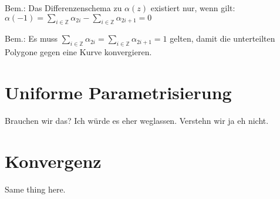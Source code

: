 \documentclass[8pt, DIV15, twocolumn]{scrartcl}
\begin{document}
Bem.: Das Differenzenschema zu $\alpha\left(z\right)$ existiert nur, wenn gilt:
$\alpha\left(-1\right) = \sum\limits_{i\in\mathbb{Z}} \alpha_{2i} - \sum\limits_{i\in\mathbb{Z}} \alpha_{2i + 1} = 0$

Bem.: Es muss $\sum\limits_{i\in\mathbb{Z}} \alpha_{2i} = \sum\limits_{i\in\mathbb{Z}} \alpha_{2i+1} = 1$ gelten, damit die unterteilten Polygone gegen eine Kurve konvergieren.

\section*{Uniforme Parametrisierung}
Brauchen wir das? Ich würde es eher weglassen. Verstehn wir ja eh nicht.
\section*{Konvergenz}
Same thing here.
\end{document}

